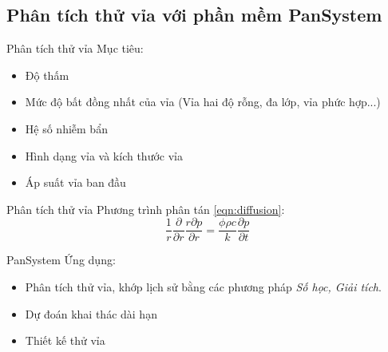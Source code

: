 \documentclass[11pt]{beamer}
\begin{document}
\subsection{Phân tích thử vỉa với phần mềm PanSystem}
\begin{frame}{Phân tích thử vỉa}
Mục tiêu:
	\begin{itemize}
		\item Độ thấm
		\item Mức độ bất đồng nhất của vỉa (Vỉa hai độ rỗng, đa lớp, vỉa phức hợp...)
		\item Hệ số nhiễm bẩn 
		\item Hình dạng vỉa và kích thước vỉa
		\item Áp suất vỉa ban đầu
	\end{itemize}
\end{frame}
\begin{frame}{Phân tích thử vỉa}
Phương trình phân tán \eqref{eqn:diffusion}:
	\begin{equation}\label{eqn:diffusion}
		\dfrac{1}{r}\dfrac{\partial}{\partial r}\dfrac{r\partial p}{\partial r} = \dfrac{\phi\rho c}{k}\dfrac{\partial p}{\partial t}
	\end{equation}
\end{frame}
\begin{frame}{PanSystem}
Ứng dụng:
	\begin{itemize}
		\item Phân tích thử vỉa, khớp lịch sử bằng các phương pháp \textit{Số học, Giải tích}.
		\item Dự đoán khai thác dài hạn
		\item Thiết kế thử vỉa
	\end{itemize}
\end{frame}
\end{document}
